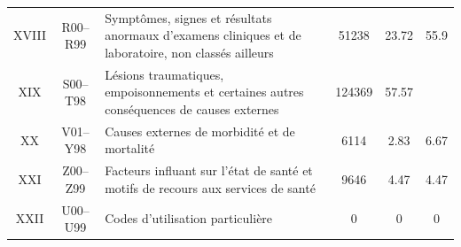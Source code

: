 \documentclass[12pt,english,french,twoside]{report}\usepackage[]{graphicx}\usepackage[]{color}
\begin{document}
\begin{longtable}{|c|c|m{4cm}|c|c|c|}

XVIII&R00–R99&Symptômes, signes et résultats anormaux d'examens cliniques et de laboratoire, non classés ailleurs&51238&23.72&55.9\\

XIX&S00–T98&Lésions traumatiques, empoisonnements et certaines autres conséquences de causes externes&124369&57.57& \\

XX&V01–Y98&Causes externes de morbidité et de mortalité& 6114&2.83&6.67\\

XXI&Z00–Z99&Facteurs influant sur l'état de santé et motifs de recours aux services de santé&9646&4.47&4.47\\

XXII&U00–U99&Codes d'utilisation particulière & 0&0&0\\

  \hline
\end{longtable}
\end{document}
